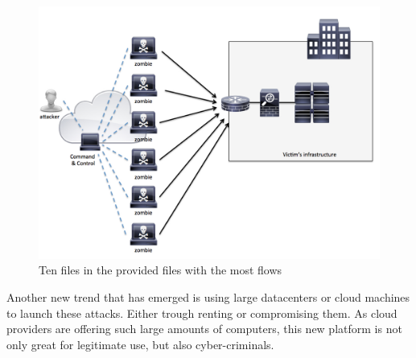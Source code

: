 \begin{figure}[h!]
\caption{Ten files in the provided files with the most flows \citep{cisco_ddos}}
\includegraphics[scale=0.2]{botnet}
\end{figure}
Another new trend that has emerged is using large datacenters or cloud machines to launch these attacks. Either trough renting or compromising them. As cloud providers are offering such large amounts of computers, this new platform is not only great for legitimate use, but also cyber-criminals.


